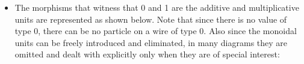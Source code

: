 \documentclass{llncs}
\begin{document}
\begin{itemize}
\item The morphisms that witness that {{0}} and {{1}} are the additive and
  multiplicative units are represented as shown below. Note that since there
  is no value of type 0, there can be no particle on a wire of type {{0}}.
  Also since the monoidal units can be freely introduced and eliminated, in
  many diagrams they are omitted and dealt with explicitly only when they are
  of special interest:
\begin{multicols}{4}
\begin{center}
\end{center}
\begin{center}
\end{center}  
\begin{center}
\end{center}
\columnbreak
\begin{center}
\end{center}
\end{multicols}


\end{itemize}
\end{document}
